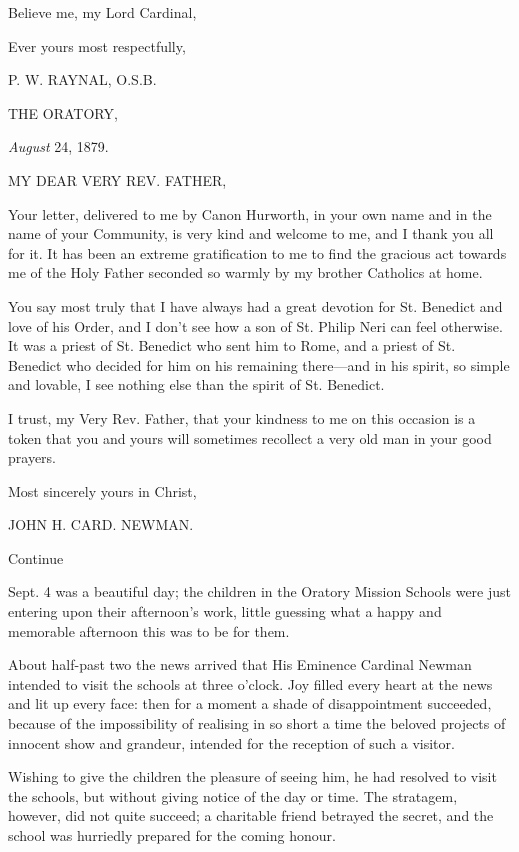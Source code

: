 Believe me, my Lord Cardinal,

Ever yours most respectfully,

P. W. RAYNAL, O.S.B.


THE ORATORY,

\emph{August} 24, 1879.

MY DEAR VERY
REV. FATHER,

Your letter, delivered to me by Canon Hurworth, in your own name and
in the name of your Community, is very kind and welcome to me, and I
thank you all for it. It has been an extreme gratification to me to
find the gracious act towards me of the Holy Father seconded so warmly
by my brother Catholics at home.

You say most truly that I have always had a great devotion for St.
Benedict and love of his Order, and I don't see how a son of St.
Philip Neri can feel otherwise. It was a priest of St. Benedict who
sent him to Rome, and a priest of St. Benedict who decided for him on
his remaining there—and in his spirit, so simple and lovable,
I see nothing else than the spirit of St. Benedict.

I trust, my Very Rev. Father, that your kindness to me on this
occasion is a token that you and yours will sometimes recollect a very
old man in your good prayers.

Most sincerely yours in Christ,

JOHN H. CARD. NEWMAN.

Continue


Sept. 4 was a beautiful day; the children in the Oratory Mission
Schools were just entering upon their afternoon's work, little
guessing what a happy and memorable afternoon this was to be for them.

About half-past two the news arrived that His Eminence Cardinal
Newman intended to visit the schools at three o'clock. Joy filled
every heart at the news and lit up every face: then for a moment a
shade of disappointment succeeded, because of the impossibility of
realising in so short a time the beloved projects of innocent show and
grandeur, intended for the reception of such a visitor.

Wishing to give the children the pleasure of seeing him, he had
resolved to visit the schools, but without giving notice of the day or
time. The stratagem, however, did not quite succeed; a charitable
friend betrayed the secret, and the school was hurriedly prepared for
the coming honour.

